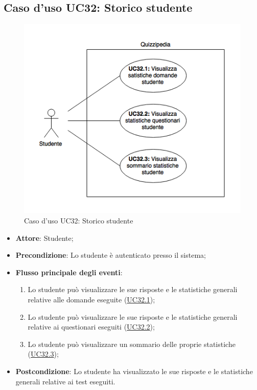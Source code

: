 \documentclass[12pt,a4paper]{article}
\begin{document}
\subsection{Caso d'uso UC32: Storico studente}
\begin{figure}[H]
	\centering
	\includegraphics[width=\textwidth]{../img/diagramUC32.png}
	\caption{Caso d'uso UC32: Storico studente}\label{fig:UC32} 
\end{figure}
\begin{itemize}

\item \textbf{Attore}: Studente; 
\item \textbf{Precondizione}: Lo studente è autenticato presso il sistema;

\item \textbf{Flusso principale degli eventi}:
\begin{enumerate}
	\item Lo studente può visualizzare le sue risposte e le statistiche generali relative alle domande eseguite (\hyperlink{UC32.1}{UC32.1});
	\item Lo studente può visualizzare le sue risposte e le statistiche generali relative ai questionari eseguiti (\hyperlink{UC32.2}{UC32.2});
	\item Lo studente può visualizzare un sommario delle proprie statistiche (\hyperlink{UC32.3}{UC32.3});
	
\end{enumerate}
\item \textbf{Postcondizione}: Lo studente ha visualizzato le sue risposte e le statistiche generali relative ai test eseguiti.
\end{itemize}
\hypertarget{UC32.1}{}
\end{document}
